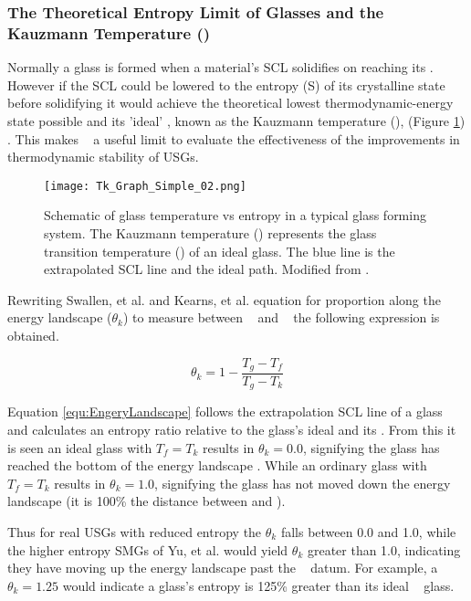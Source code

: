 \documentclass[draft,a4paper,12pt,oneside]{report}%
\begin{document}
\subsubsection{The Theoretical Entropy Limit of Glasses and the Kauzmann Temperature (\Tk)}
Normally a glass is formed when a material's SCL solidifies on reaching its \Tg. However if the SCL could be lowered to the entropy (S) of its crystalline state before solidifying it would achieve the theoretical lowest thermodynamic-energy state possible and its 'ideal' \Tg, known as the Kauzmann temperature  (\Tk), (Figure \ref{fig:TkGraph}) \cite{Swallen2007, Kearns2008} . This makes \Tk~ a useful limit to evaluate the effectiveness of the improvements in thermodynamic stability of USGs. 

\begin{figure}[htbp]
	\centering
	\texttt{[image: Tk\_Graph\_Simple\_02.png]}
	\caption[Kauzmann Temperature]{Schematic of glass temperature vs entropy in a typical glass forming system. The Kauzmann temperature (\Tk) represents the glass transition temperature (\Tg) of an ideal glass. The blue line is the extrapolated SCL line and the ideal path. Modified from \cite{Kearns2008}.}
	\label{fig:TkGraph}
\end{figure}

Rewriting Swallen, et al. \cite{Swallen2007} and Kearns, et al. \cite{Kearns2008} equation for proportion along the energy landscape ($\theta_{k}$) to measure between \Tk~ and \Tg~ the following expression is obtained. 

\begin{equation}
\theta_{k} = 1 - \frac{T_{g}-T_{f}}{T_{g}-T_{k}}
\label{equ:EngeryLandscape}
\end{equation}

Equation \ref{equ:EngeryLandscape} follows the extrapolation SCL line of a glass and calculates an entropy ratio relative to the glass's ideal \Tk and its \Tg. From this it is seen an ideal glass with $T_{f}=T_{k}$ results in $\theta_{k}=0.0$, signifying the glass has reached the bottom of the energy landscape \cite{Swallen2007, Kearns2008}. While an ordinary glass with  $T_{f}=T_{k}$ results in $\theta_{k}=1.0$, signifying the glass has not moved down the energy landscape (it is 100\% the distance between \Tk and \Tg).

Thus for real USGs with reduced entropy the $\theta_{k}$ falls between 0.0 and 1.0, while the higher entropy  SMGs of Yu, et al. \cite{Yu2013} would yield $\theta_{k}$ greater than 1.0, indicating they have moving up the energy landscape past the \Tg~ datum. For example, a $\theta_{k}=1.25$ would indicate a glass's entropy is 125\% greater than its ideal \Tk~ glass.
\end{document}
